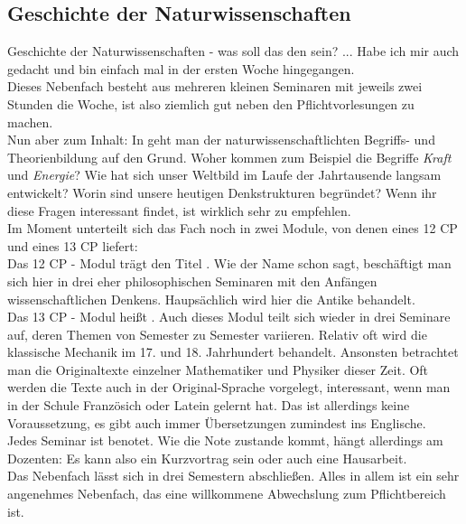 \subsection{Geschichte der Naturwissenschaften}
\label{subsec:geschichte}
Geschichte der Naturwissenschaften - was soll das den sein? ... Habe ich mir auch gedacht und bin einfach mal in der ersten Woche hingegangen.\\
Dieses Nebenfach besteht aus mehreren kleinen Seminaren mit jeweils zwei Stunden die Woche, ist also ziemlich gut neben den Pflichtvorlesungen zu machen.\\
Nun aber zum Inhalt: In  geht man der naturwissenschaftlichten Begriffs- und Theorienbildung auf den Grund. Woher kommen zum Beispiel die Begriffe \textit{Kraft} und \textit{Energie}? Wie hat sich unser Weltbild im Laufe der Jahrtausende langsam entwickelt? Worin sind unsere heutigen Denkstrukturen begründet? Wenn ihr diese Fragen interessant findet, ist  wirklich sehr zu empfehlen.\\
Im Moment unterteilt sich das Fach noch in zwei Module, von denen eines 12 CP und eines 13 CP liefert:\\
Das 12 CP - Modul trägt den Titel .
Wie der Name schon sagt, beschäftigt man sich hier in drei eher philosophischen Seminaren mit den Anfängen wissenschaftlichen Denkens. Haupsächlich wird hier die Antike behandelt.\\
Das 13 CP - Modul hei\ss t . Auch dieses Modul teilt sich wieder in drei Seminare auf, deren Themen von Semester zu Semester variieren. Relativ oft wird die klassische Mechanik im 17. und 18. Jahrhundert behandelt. Ansonsten betrachtet man die Originaltexte einzelner Mathematiker und Physiker dieser Zeit. Oft werden die Texte auch in der Original-Sprache vorgelegt, interessant, wenn man in der Schule Französich oder Latein gelernt hat. Das ist allerdings keine Voraussetzung, es gibt auch immer Übersetzungen zumindest ins Englische.\\
Jedes Seminar ist benotet. Wie die Note zustande kommt, hängt allerdings am Dozenten: Es kann also ein Kurzvortrag sein oder auch eine Hausarbeit.\\
Das Nebenfach lässt sich in drei Semestern abschlie\ss en. Alles in allem ist  ein sehr angenehmes Nebenfach, das eine willkommene Abwechslung zum Pflichtbereich ist.
